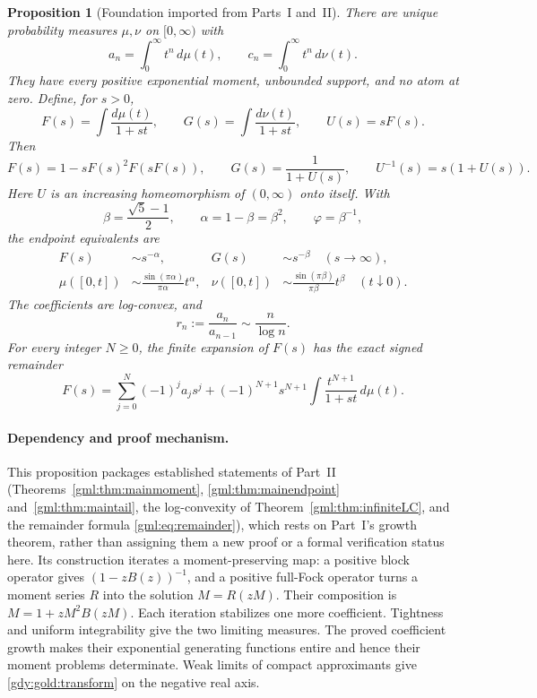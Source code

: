 \documentclass[11pt]{article}
\numberwithin{equation}{section}
\newtheorem{proposition}[theorem]{Proposition}
\theoremstyle{definition}
\theoremstyle{remark}
\begin{document}
\begin{proposition}[Foundation imported from Parts~I and~II]
\label{gdy:gold:foundation}
There are unique probability measures $\mu,\nu$ on $[0,\infty)$ with
\[
 a_n=\int_0^\infty t^n\,d\mu(t),\qquad
 c_n=\int_0^\infty t^n\,d\nu(t).
\]
They have every positive exponential moment, unbounded support, and no
atom at zero. Define, for $s>0$,
\begin{equation}\label{gdy:gold:stieltjes}
 F(s)=\int\frac{d\mu(t)}{1+st},\qquad
 G(s)=\int\frac{d\nu(t)}{1+st},\qquad U(s)=sF(s).
\end{equation}
Then
\begin{equation}\label{gdy:gold:transform}
 F(s)=1-sF(s)^2F(sF(s)),\qquad
 G(s)=\frac1{1+U(s)},\qquad
 U^{-1}(s)=s(1+U(s)).
\end{equation}
Here $U$ is an increasing homeomorphism of $(0,\infty)$ onto itself.
With
\[
 \beta=\frac{\sqrt5-1}{2},\qquad
 \alpha=1-\beta=\beta^2,\qquad \varphi=\beta^{-1},
\]
the endpoint equivalents are
\begin{align}
 F(s)&\sim s^{-\alpha},&G(s)&\sim s^{-\beta} \quad(s\to\infty),
 \label{gdy:gold:leading}\\
 \mu([0,t])&\sim\frac{\sin(\pi\alpha)}{\pi\alpha}t^\alpha,&
 \nu([0,t])&\sim\frac{\sin(\pi\beta)}{\pi\beta}t^\beta
 \quad(t\downarrow0).\label{gdy:gold:cdf}
\end{align}
The coefficients are log-convex, and
\begin{equation}\label{gdy:gold:ratios}
 r_n:=\frac{a_n}{a_{n-1}}\sim\frac n{\log n}.
\end{equation}
For every integer $N\ge0$, the finite expansion of $F(s)$ has the exact
signed remainder
\begin{equation}\label{gdy:gold:finite}
 F(s)=\sum_{j=0}^{N}(-1)^ja_js^j
 +(-1)^{N+1}s^{N+1}\int\frac{t^{N+1}}{1+st}\,d\mu(t).
\end{equation}
\end{proposition}

\paragraph{Dependency and proof mechanism.}
This proposition packages established statements of Part~II
(Theorems~\ref{gml:thm:mainmoment}, \ref{gml:thm:mainendpoint}
and~\ref{gml:thm:maintail}, the log-convexity of
Theorem~\ref{gml:thm:infiniteLC}, and the remainder formula
\eqref{gml:eq:remainder}), which rests on Part~I's growth theorem,
rather than assigning them a new proof or a formal verification
status here. Its construction iterates a moment-preserving map: a positive
block operator gives $(1-zB(z))^{-1}$, and a positive full-Fock operator
turns a moment series $R$ into the solution $M=R(zM)$. Their composition
is $M=1+zM^2B(zM)$. Each iteration stabilizes one more coefficient.
Tightness and uniform integrability give the two limiting measures.
The proved coefficient growth makes their exponential generating functions
entire and hence their moment problems determinate. Weak limits of compact
approximants give \eqref{gdy:gold:transform} on the negative real axis.
\end{document}
